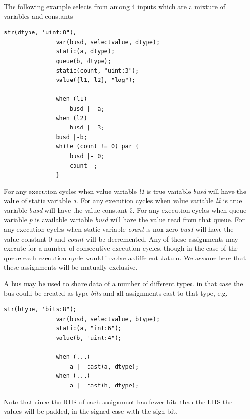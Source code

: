         The following example selects from among 4 inputs which are a mixture
        of variables and constants -
        \begin{lstlisting}[gobble=8, language=threepl]
               str(dtype, "uint:8");
               var(busd, selectvalue, dtype);
               static(a, dtype);
               queue(b, dtype);
               static(count, "uint:3");
               value({l1, l2}, "log");
               
               when (l1)
                   busd |- a;
               when (l2)
                   busd |- 3;
               busd |-b;
               while (count != 0) par {
                   busd |- 0;
                   count--;
               }
        \end{lstlisting}
        For any execution cycles when value variable {\em l1} is true
        variable {\em busd} will have the value of static variable {\em a}.
        For any execution cycles when value variable {\em l2} is true
        variable {\em busd} will have the value constant 3. For any execution
        cycles when queue variable {\em p} is available variable {\em busd}
        will have the value read from that queue. For any execution cycles
        when static variable {\em count} is non-zero {\em busd} will have the
        value constant 0 and {\em count} will be decremented. Any of these
        assignments may execute for a number of consecutive execution cycles,
        though in the case of the queue each execution cycle would involve a
        different datum. We assume here that these assignments will be
        mutually exclusive.

        A bus may be used to share data of a number of different types. in
        that case the bus could be created as type {\em bits} and all
        assignments cast to that type, e.g.
        \begin{lstlisting}[gobble=8, language=threepl]
               str(btype, "bits:8");
               var(busd, selectvalue, btype);
               static(a, "int:6");
               value(b, "uint:4");
               
               when (...)
                   a |- cast(a, dtype);
               when (...)
                   a |- cast(b, dtype);
        \end{lstlisting}
        Note that since the RHS of each assignment has fewer bits than the LHS
        the values will be padded, in the signed case with the sign bit.










